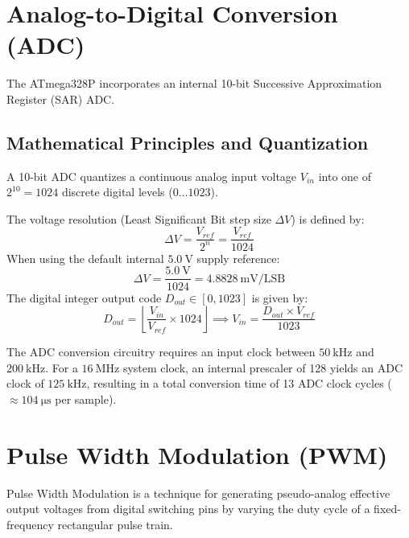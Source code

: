 \section{Analog-to-Digital Conversion (ADC)}
The ATmega328P incorporates an internal 10-bit Successive Approximation Register (SAR) ADC.

\subsection{Mathematical Principles and Quantization}
A 10-bit ADC quantizes a continuous analog input voltage $V_{in}$ into one of $2^{10} = 1024$ discrete digital levels ($0 \dots 1023$).

\begin{derivationbox}
The voltage resolution (Least Significant Bit step size $\Delta V$) is defined by:
\begin{equation}
\Delta V = \frac{V_{ref}}{2^n} = \frac{V_{ref}}{1024}
\end{equation}
When using the default internal $\SI{5.0}{\volt}$ supply reference:
\begin{equation}
\Delta V = \frac{\SI{5.0}{\volt}}{1024} = \SI{4.8828}{\milli\volt}/\text{LSB}
\end{equation}
The digital integer output code $D_{out} \in [0, 1023]$ is given by:
\begin{equation}
D_{out} = \left\lfloor \frac{V_{in}}{V_{ref}} \times 1024 \right\rfloor \implies V_{in} = \frac{D_{out} \times V_{ref}}{1023}
\end{equation}
\end{derivationbox}

The ADC conversion circuitry requires an input clock between $\SI{50}{\kilo\hertz}$ and $\SI{200}{\kilo\hertz}$. For a $\SI{16}{\mega\hertz}$ system clock, an internal prescaler of 128 yields an ADC clock of $\SI{125}{\kilo\hertz}$, resulting in a total conversion time of 13 ADC clock cycles ($\approx \SI{104}{\micro\second}$ per sample).

\section{Pulse Width Modulation (PWM)}
Pulse Width Modulation is a technique for generating pseudo-analog effective output voltages from digital switching pins by varying the duty cycle of a fixed-frequency rectangular pulse train.


